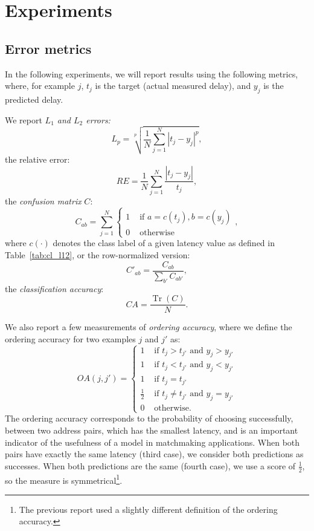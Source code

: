 \documentclass[10pt,a4paper,notitlepage,twocolumn]{article}
\begin{document}
\section{Experiments}

\subsection{Error metrics}

In the following experiments, we will report results using the following
metrics, where, for example $j$, $t_j$ is the target (actual measured
delay), and $y_j$ is the predicted delay.

We report {\em $L_1$ and $L_2$ errors:}
\begin{equation}
L_p = \sqrt[p]{\frac1N\sum_{j=1}^N \left|t_j-y_j\right|^p},
\end{equation}
%
the {relative error:}
\begin{equation}
RE = \frac1N\sum_{j=1}^N \frac{|t_j-y_j|}{t_j},
\end{equation}
%
the {\em confusion matrix} $C$:
\begin{equation}
C_{ab} = \sum_{j=1}^N
\begin{cases}
1 & \text{\ if } a=c(t_j),b=c(y_j) \\ 
0 & \text{\ otherwise}
\end{cases},
\end{equation}
where $c(\cdot)$ denotes the class label of a given latency value as defined in Table~\ref{tab:cl_l12},
or the row-normalized version:
\begin{equation}
C'_{ab} = \frac{C_{ab}}{\sum_{b'} C_{ab'}},
\end{equation}
%
the {\em classification accuracy}\/:
\begin{equation}
CA = \frac{\operatorname{Tr}(C)}N.
\end{equation}

We also report a few measurements of {\em ordering accuracy}, where we define
the ordering accuracy for two examples $j$ and $j'$ as:
\begin{equation}
  OA(j, j') =
  \begin{cases}
    1 & \text{\ if } t_j > t_{j'} \text{\ and } y_j > y_{j'} \\
    1 & \text{\ if } t_j < t_{j'} \text{\ and } y_j < y_{j'} \\
    1 & \text{\ if } t_j = t_{j'} \\
    \frac{1}{2} & \text{\ if } t_j \neq t_{j'} \text{\ and } y_j = y_{j'} \\
    0 & \text{\ otherwise.}
  \end{cases}
\label{eq:oa}
\end{equation}
The ordering accuracy corresponds to the probability of choosing
successfully, between two address pairs, which has the smallest
latency, and is an important indicator of the usefulness of a model in
matchmaking applications. When both pairs have exactly the same latency
(third case), we consider both predictions as successes. When both
predictions are the same (fourth case), we use a score of $\frac{1}{2}$,
so the measure is symmetrical\footnote{The previous report used a
slightly different definition of the ordering accuracy.}.
\end{document}
